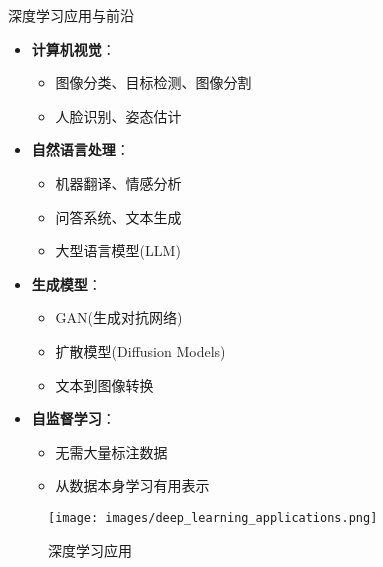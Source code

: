 \documentclass[
  ignorenonframetext,
  aspectratio=169,
  chinese-hans,
]{beamer}
\providecommand{\tightlist}{%
  \setlength{\itemsep}{0pt}\setlength{\parskip}{0pt}}\usepackage{longtable,booktabs,array}
\begin{document}
\begin{frame}{深度学习应用与前沿}
\label{ux6df1ux5ea6ux5b66ux4e60ux5e94ux7528ux4e0eux524dux6cbf}
\begin{itemize}
\tightlist
\item
  \textbf{计算机视觉}：

  \begin{itemize}
  \tightlist
  \item
    图像分类、目标检测、图像分割
  \item
    人脸识别、姿态估计
  \end{itemize}
\item
  \textbf{自然语言处理}：

  \begin{itemize}
  \tightlist
  \item
    机器翻译、情感分析
  \item
    问答系统、文本生成
  \item
    大型语言模型(LLM)
  \end{itemize}
\item
  \textbf{生成模型}：

  \begin{itemize}
  \tightlist
  \item
    GAN(生成对抗网络)
  \item
    扩散模型(Diffusion Models)
  \item
    文本到图像转换
  \end{itemize}
\item
  \textbf{自监督学习}：

  \begin{itemize}
  \tightlist
  \item
    无需大量标注数据
  \item
    从数据本身学习有用表示
  \end{itemize}
\end{itemize}

\begin{figure}[H]

{\centering \texttt{[image: images/deep\_learning\_applications.png]}

}

\caption{深度学习应用}

\end{figure}%
\end{frame}
\end{document}
